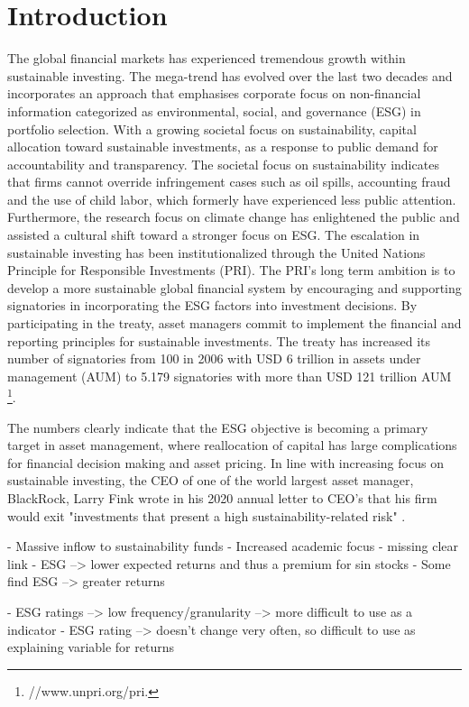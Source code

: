 \section{Introduction} \label{sec:intro}
The global financial markets has experienced tremendous growth within sustainable investing. The mega-trend has evolved over the last two decades and incorporates an approach that emphasises corporate focus on non-financial information categorized as environmental, social, and governance (ESG) in portfolio selection. With a growing societal focus on sustainability, capital allocation toward sustainable investments, as a response to public demand for accountability and transparency. The societal focus on sustainability indicates that firms cannot override infringement cases such as oil spills, accounting fraud and the use of child labor, which formerly have experienced less public attention. Furthermore, the research focus on climate change has enlightened the public and assisted a cultural shift toward a stronger focus on ESG. The escalation in sustainable investing has been institutionalized through the United Nations Principle for Responsible Investments (PRI). The PRI's long term ambition is to develop a more sustainable global financial system by encouraging and supporting signatories in incorporating the ESG factors into investment decisions. By participating in the treaty, asset managers commit to implement the financial and reporting principles for sustainable investments. The treaty has increased its number of signatories from 100 in 2006 with USD 6 trillion in assets under management (AUM) to 5.179 signatories with more than USD 121 trillion AUM \footnote{//www.unpri.org/pri.}. 

The numbers clearly indicate that the ESG objective is becoming a primary target in asset management, where reallocation of capital has large complications for financial decision making and asset pricing. In line with increasing focus on sustainable investing, the CEO of one of the world largest asset manager, BlackRock, Larry Fink wrote in his 2020 annual letter to CEO's that his firm would exit "investments that present a high sustainability-related risk" \citep{Blackrock}. 


- Massive inflow to sustainability funds
- Increased academic focus
- missing clear link
- ESG --> lower expected returns and thus a premium for sin stocks
- Some find ESG --> greater returns


- ESG ratings --> low frequency/granularity --> more difficult to use as a indicator
- ESG rating --> doesn't change very often, so difficult to use as explaining variable for returns


